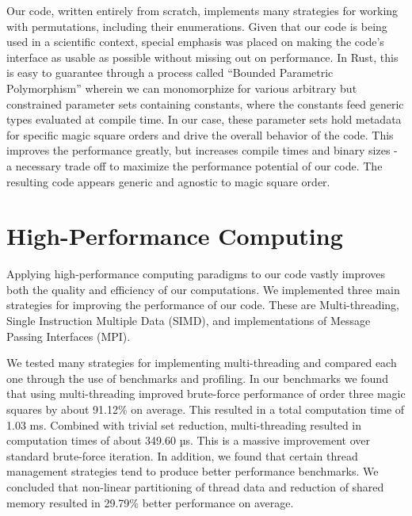 \documentclass[12pt]{report}
\begin{document}
\par Our code, written entirely from scratch, implements many strategies for working with
permutations, including their enumerations. Given that our code is being used in a scientific
context, special emphasis was placed on making the code's interface as usable as possible without
missing out on performance. In Rust, this is easy to guarantee through a process called ``Bounded
Parametric Polymorphism'' wherein we can monomorphize for various arbitrary but constrained
parameter sets containing constants, where the constants feed generic types evaluated at compile
time\cite{Cardelli}. In our case, these parameter sets hold metadata for specific magic square
orders and drive the overall behavior of the code. This improves the performance greatly, but
increases compile times and binary sizes \hyphen{} a necessary trade off to maximize the
performance potential of our code. The resulting code appears generic and agnostic to magic square
order.

\section{High-Performance Computing}

\par Applying high-performance computing paradigms to our code vastly improves both the quality and
efficiency of our computations. We implemented three main strategies for improving the performance
of our code. These are Multi-threading, Single Instruction Multiple Data (SIMD), and
implementations of Message Passing Interfaces (MPI).

\par We tested many strategies for implementing multi-threading and compared each one through the
use of benchmarks and profiling. In our benchmarks we found that using multi-threading improved
brute-force performance of order three magic squares by about 91.12\% on average. This resulted in
a total computation time of 1.03 ms. Combined with trivial set reduction, multi-threading resulted
in computation times of about 349.60 µs. This is a massive improvement over standard brute-force
iteration. In addition, we found that certain thread management strategies tend to produce better
performance benchmarks. We concluded that non-linear partitioning of thread data and reduction of
shared memory resulted in 29.79\% better performance on average.
\end{document}
